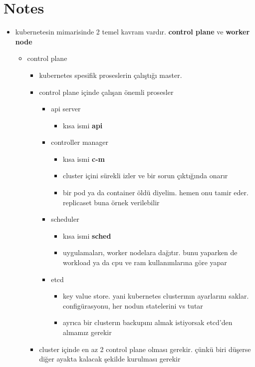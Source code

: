 \documentclass[14pt]{article}
\begin{document}
\section*{Notes}
\label{sec:org556b35b}
\begin{itemize}
\item kubernetesin mimarisinde 2 temel kavram vardır. \textbf{control plane} ve \textbf{worker node}
\begin{itemize}
\item control plane
\begin{itemize}
\item kubernetes spesifik proseslerin çalıştığı master.
\item control plane içinde çalışan önemli prosesler
\begin{itemize}
\item api server
\begin{itemize}
\item kısa ismi \textbf{api}
\end{itemize}
\item controller manager
\begin{itemize}
\item kısa ismi \textbf{c-m}
\item cluster içini sürekli izler ve bir sorun çıktığında onarır
\item bir pod ya da container öldü diyelim. hemen onu tamir eder. replicaset buna örnek verilebilir
\end{itemize}
\item scheduler
\begin{itemize}
\item kısa ismi \textbf{sched}
\item uygulamaları, worker nodelara dağıtır. bunu yaparken de workload ya da cpu ve ram kullanımlarına göre yapar
\end{itemize}
\item etcd
\begin{itemize}
\item key value store. yani kubernetes clusterının ayarlarını saklar. configürasyonu, her nodun statelerini vs tutar
\item ayrıca bir clusterın backupını almak istiyorsak etcd'den almamız gerekir
\end{itemize}
\end{itemize}
\item cluster içinde en az 2 control plane olması gerekir. çünkü biri düşerse diğer ayakta kalacak şekilde kurulması gerekir
\end{itemize}

\end{itemize}
\end{itemize}
\end{document}
